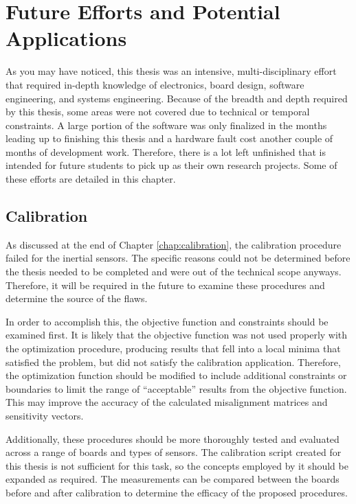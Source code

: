 \chapter{Future Efforts and Potential Applications} 
As you may have noticed, this thesis was an intensive, multi-disciplinary effort that required in-depth knowledge of electronics, board design, software engineering, and systems engineering.
Because of the breadth and depth required by this thesis, some areas were not covered due to technical or temporal constraints.
A large portion of the software was only finalized in the months leading up to finishing this thesis and a hardware fault cost another couple of months of development work.
Therefore, there is a lot left unfinished that is intended for future students to pick up as their own research projects.
Some of these efforts are detailed in this chapter.

\section{Calibration} 
As discussed at the end of Chapter \ref{chap:calibration}, the calibration procedure failed for the inertial sensors.
The specific reasons could not be determined before the thesis needed to be completed and were out of the technical scope anyways.
Therefore, it will be required in the future to examine these procedures and determine the source of the flaws.

In order to accomplish this, the objective function and constraints should be examined first.
It is likely that the objective function was not used properly with the optimization procedure, producing results that fell into a local minima that satisfied the problem, but did not satisfy the calibration application.
Therefore, the optimization function should be modified to include additional constraints or boundaries to limit the range of ``acceptable'' results from the objective function.
This may improve the accuracy of the calculated misalignment matrices and sensitivity vectors.

Additionally, these procedures should be more thoroughly tested and evaluated across a range of boards and types of sensors.
The calibration script created for this thesis is not sufficient for this task, so the concepts employed by it should be expanded as required.
The measurements can be compared between the boards before and after calibration to determine the efficacy of the proposed procedures.

